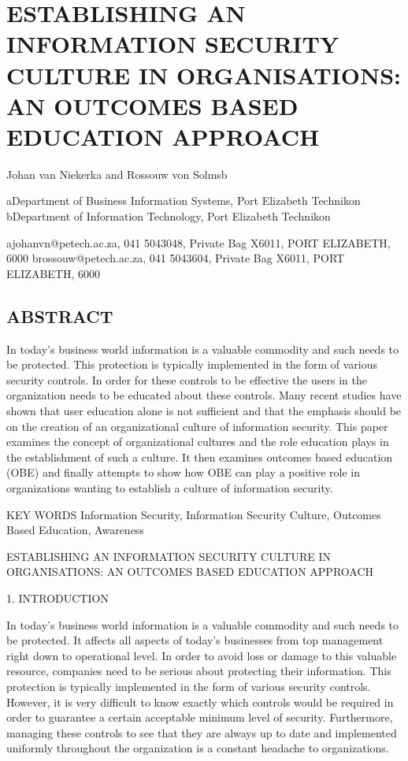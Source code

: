 \appendix
\chapter{ ESTABLISHING AN INFORMATION SECURITY CULTURE IN
ORGANISATIONS: AN OUTCOMES BASED EDUCATION APPROACH}

Johan van Niekerka and Rossouw von Solmsb

aDepartment of Business Information Systems, Port Elizabeth
Technikon bDepartment of Information Technology, Port Elizabeth
Technikon

ajohanvn@petech.ac.za, 041 5043048, Private Bag X6011, PORT
ELIZABETH, 6000 brossouw@petech.ac.za, 041 5043604, Private Bag
X6011, PORT ELIZABETH, 6000

\section{ABSTRACT} In today's business world information is a
valuable commodity and such needs to be protected. This protection
is typically implemented in the form of various security controls.
In order for these controls to be effective the users in the
organization needs to be educated about these controls. Many
recent studies have shown that user education alone is not
sufficient and that the emphasis should be on the creation of an
organizational culture of information security. This paper
examines the concept of organizational cultures and the role
education plays in the establishment of such a culture. It then
examines outcomes based education (OBE) and finally attempts to
show how OBE can play a positive role in organizations wanting to
establish a culture of information security.

KEY WORDS Information Security, Information Security Culture,
Outcomes Based Education, Awareness


ESTABLISHING AN INFORMATION SECURITY CULTURE IN ORGANISATIONS: AN
OUTCOMES BASED EDUCATION APPROACH

1.  INTRODUCTION

In today's business world information is a valuable commodity and
such needs to be protected. It affects all aspects of today's
businesses from top management right down to operational level. In
order to avoid loss or damage to this valuable resource, companies
need to be serious about protecting their information. This
protection is typically implemented in the form of various
security controls. However, it is very difficult to know exactly
which controls would be required in order to guarantee a certain
acceptable minimum level of security. Furthermore, managing these
controls to see that they are always up to date and implemented
uniformly throughout the organization is a constant headache to
organizations.

